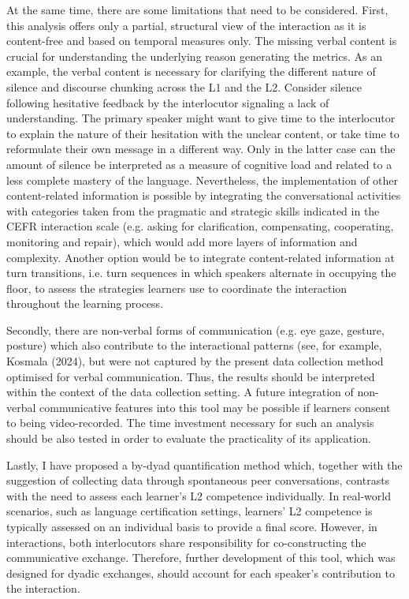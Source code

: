 \begin{styleStandard}
At the same time, there are some limitations that need to be considered. First, this analysis offers only a partial, structural view of the interaction as it is content-free and based on temporal measures only. The missing verbal content is crucial for understanding the underlying reason generating the metrics. As an example, the verbal content is necessary for clarifying the different nature of silence and discourse chunking across the L1 and the L2. Consider silence following hesitative feedback by the interlocutor signaling a lack of understanding. The primary speaker might want to give time to the interlocutor to explain the nature of their hesitation with the unclear content, or take time to reformulate their own message in a different way. Only in the latter case can the amount of silence be interpreted as a measure of cognitive load and related to a less complete mastery of the language. Nevertheless, the implementation of other content-related information is possible by integrating the conversational activities with categories taken from the pragmatic and strategic skills indicated in the CEFR interaction scale (e.g. asking for clarification, compensating, cooperating, monitoring and repair), which would add more layers of information and complexity. Another option would be to integrate content-related information at turn transitions, i.e. turn sequences in which speakers alternate in occupying the floor, to assess the strategies learners use to coordinate the interaction throughout the learning process.
\end{styleStandard}

\begin{styleStandard}
Secondly, there are non-verbal forms of communication (e.g. eye gaze, gesture, posture) which also contribute to the interactional patterns (see, for example, Kosmala (2024), but were not captured by the present data collection method optimised for verbal communication. Thus, the results should be interpreted within the context of the data collection setting. A future integration of non-verbal communicative features into this tool may be possible if learners consent to being video-recorded. The time investment necessary for such an analysis should be also tested in order to evaluate the practicality of its application.
\end{styleStandard}

\begin{styleStandard}
Lastly, I have proposed a by-dyad quantification method which, together with the suggestion of collecting data through spontaneous peer conversations, contrasts with the need to assess each learner’s L2 competence individually. In real-world scenarios, such as language certification settings, learners’ L2 competence is typically assessed on an individual basis to provide a final score. However, in interactions, both interlocutors share responsibility for co-constructing the communicative exchange. Therefore, further development of this tool, which was designed for dyadic exchanges, should account for each speaker’s contribution to the interaction.
\end{styleStandard}

